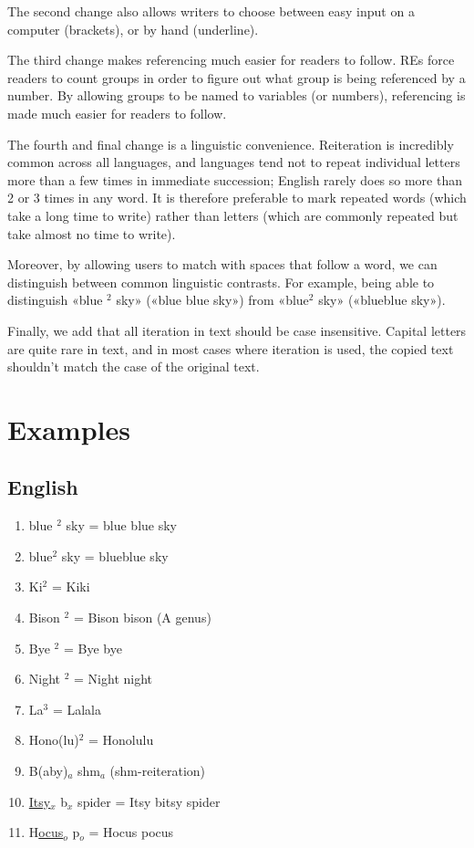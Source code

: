 \documentclass{article}
\newcommand{\h}[1]{$^{#1}$}
\newcommand{\s}[1]{$_{#1}$}
\begin{document}
The second change also allows writers to choose between easy input on a
computer (brackets), or by hand (underline).

The third change makes referencing much easier for readers to follow. REs force
readers to count groups in order to figure out what group is being referenced
by a number. By allowing groups to be named to variables (or numbers),
referencing is made much easier for readers to follow.

The fourth and final change is a linguistic convenience. Reiteration is
incredibly common across all languages, and languages tend not to repeat
individual letters more than a few times in immediate succession; English rarely
does so more than 2 or 3 times in any word. It is therefore preferable to mark
repeated words (which take a long time to write) rather than letters (which are
commonly repeated but take almost no time to write).

Moreover, by allowing users to match with spaces that follow a word, we can
distinguish between common linguistic contrasts. For example, being able to
distinguish «blue \h{2} sky» («blue blue sky») from «blue\h{2} sky» («blueblue
sky»).

Finally, we add that all iteration in text should be case insensitive. Capital
letters are quite rare in text, and in most cases where iteration is used,
the copied text shouldn't match the case of the original text.

\section{Examples}

\subsection{English}

\begin{enumerate}
  \item blue \h{2} sky = blue blue sky
  \item blue\h{2} sky = blueblue sky
  \item Ki\h{2} = Kiki
  \item Bison \h{2} = Bison bison (A genus)
  \item Bye \h{2} = Bye bye
  \item Night \h{2} = Night night
  \item La\h{3} = Lalala
  \item Hono(lu)\h{2} = Honolulu
  \item B(aby)\s{a} shm\s{a} (shm-reiteration)
  \item \underline{Itsy}\s{x} b\s{x} spider = Itsy bitsy spider
  \item H\underline{ocus}\s{o} p\s{o} = Hocus pocus
\end{enumerate}
\end{document}
